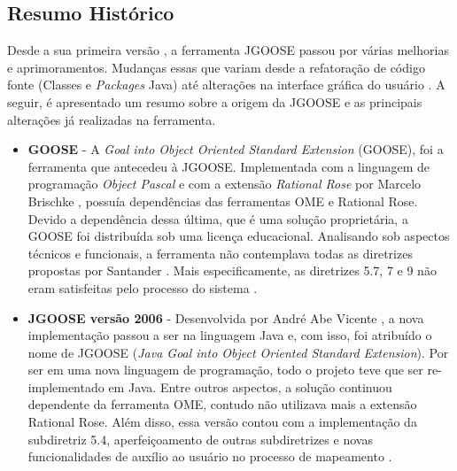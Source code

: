         \subsection{Resumo Histórico}
            \label{cap:jgoose-subsec:historico}
                Desde a sua primeira versão \cite{vicente2006}, a ferramenta JGOOSE passou por várias melhorias e aprimoramentos.
                Mudanças essas que variam desde a refatoração de código fonte (Classes e \emph{Packages} Java) até alterações na interface gráfica do usuário \cite{brischke2011melhorando}.
                A seguir, é apresentado um resumo sobre a origem da JGOOSE e as principais alterações já realizadas na ferramenta.
            \begin{itemize}
                \item \textbf{GOOSE} -
                    A \emph{Goal into Object Oriented Standard Extension} (GOOSE), foi a ferramenta que antecedeu à JGOOSE.
                        Implementada com a linguagem de programação \emph{Object Pascal} e com a extensão \emph{Rational Rose} por Marcelo Brischke \cite{brischke2005desenvolvimento}, possuía dependências das ferramentas OME e Rational Rose.
                    Devido a dependência dessa última, que é uma solução proprietária, a GOOSE foi distribuída sob uma licença educacional.
                    Analisando sob aspectos técnicos e funcionais, a ferramenta não contemplava todas as diretrizes propostas por Santander \cite{santander2002integrando}. Mais especificamente, as diretrizes 5.7, 7 e 9 não eram satisfeitas pelo processo do sistema \cite{brischke2005desenvolvimento}.

                \item \textbf{JGOOSE versão 2006} -
                    Desenvolvida por André Abe Vicente \cite{vicente2006},
                        a nova implementação passou a ser na linguagem Java e, com isso, foi atribuído o nome de JGOOSE (\emph{Java Goal into Object Oriented Standard Extension}).
                    Por ser em uma nova linguagem de programação, todo o projeto teve que ser re-implementado em Java.
                    Entre outros aspectos, a solução continuou dependente da ferramenta OME, contudo não utilizava mais a extensão Rational Rose.
                    Além disso, essa versão contou com a implementação da subdiretriz 5.4, aperfeiçoamento de outras subdiretrizes e novas funcionalidades de auxílio ao usuário no processo de mapeamento \cite{vicente2006}.


\end{itemize}
